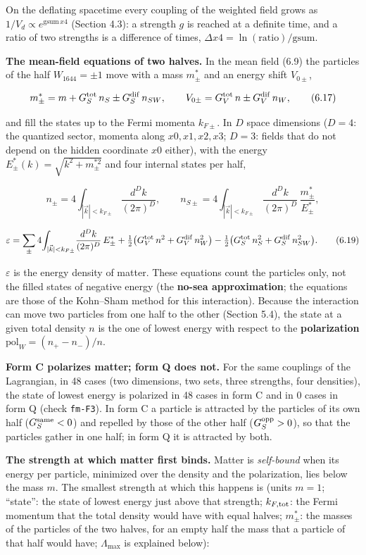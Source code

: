 \documentclass[
  10pt,
]{article}
\begin{document}
On the deflating spacetime every coupling of the weighted field grows as
\(1/V_d\propto e^{\mathrm{gsum}\,x4}\) (Section 4.3): a strength \(g\)
is reached at a definite time, and a ratio of two strengths is a
difference of times, \(\Delta x4=\ln(\text{ratio})/\mathrm{gsum}\).

\textbf{The mean-field equations of two halves.} In the mean field (6.9)
the particles of the half \(W_{1644}=\pm1\) move with a mass \(m^*_\pm\)
and an energy shift \(V_{0\pm}\),

\[m^*_\pm=m+G_S^{\rm tot}\,n_S\pm G_S^{\rm dif}\,n_{SW},\qquad V_{0\pm}=G_V^{\rm tot}\,n\pm G_V^{\rm dif}\,n_W,\tag{6.17}\]

and fill the states up to the Fermi momenta \(k_{F\pm}\). In \(D\) space
dimensions (\(D=4\): the quantized sector, momenta along
\(x0,x1,x2,x3\); \(D=3\): fields that do not depend on the hidden
coordinate \(x0\) either), with the energy
\(E^*_\pm(k)=\sqrt{k^2+m_\pm^{*2}}\) and four internal states per half,

\[n_\pm=4\!\int_{|\vec k|<k_{F\pm}}\!\frac{d^Dk}{(2\pi)^D},\qquad
n_{S\pm}=4\!\int_{|\vec k|<k_{F\pm}}\!\frac{d^Dk}{(2\pi)^D}\,\frac{m^*_\pm}{E^*_\pm},\tag{6.18}\]

\[\varepsilon=\sum_\pm4\!\int_{|\vec k|<k_{F\pm}}\!\frac{d^Dk}{(2\pi)^D}\,E^*_\pm
+\tfrac12\big(G_V^{\rm tot}\,n^2+G_V^{\rm dif}\,n_W^2\big)-\tfrac12\big(G_S^{\rm tot}\,n_S^2+G_S^{\rm dif}\,n_{SW}^2\big).\tag{6.19}\]

\(\varepsilon\) is the energy density of matter. These equations count
the particles only, not the filled states of negative energy (the
\textbf{no-sea approximation}; the equations are those of the Kohn--Sham
method for this interaction). Because the interaction can move two
particles from one half to the other (Section 5.4), the state at a given
total density \(n\) is the one of lowest energy with respect to the
\textbf{polarization} \(\mathrm{pol}_W=(n_+-n_-)/n\).

\textbf{Form C polarizes matter; form Q does not.} For the same
couplings of the Lagrangian, in 48 cases (two dimensions, two sets,
three strengths, four densities), the state of lowest energy is
polarized in 48 cases in form C and in 0 cases in form Q (check
\texttt{fm-F3}). In form C a particle is attracted by the particles of
its own half (\(G_S^{\rm same}<0\)) and repelled by those of the other
half (\(G_S^{\rm opp}>0\)), so that the particles gather in one half; in
form Q it is attracted by both.

\textbf{The strength at which matter first binds.} Matter is
\emph{self-bound} when its energy per particle, minimized over the
density and the polarization, lies below the mass \(m\). The smallest
strength at which this happens is (units \(m=1\); ``state'': the state
of lowest energy just above that strength; \(k_{F,\rm tot}\): the Fermi
momentum that the total density would have with equal halves;
\(m^*_\pm\): the masses of the particles of the two halves, for an empty
half the mass that a particle of that half would have;
\(\Lambda_{\max}\) is explained below):
\end{document}
